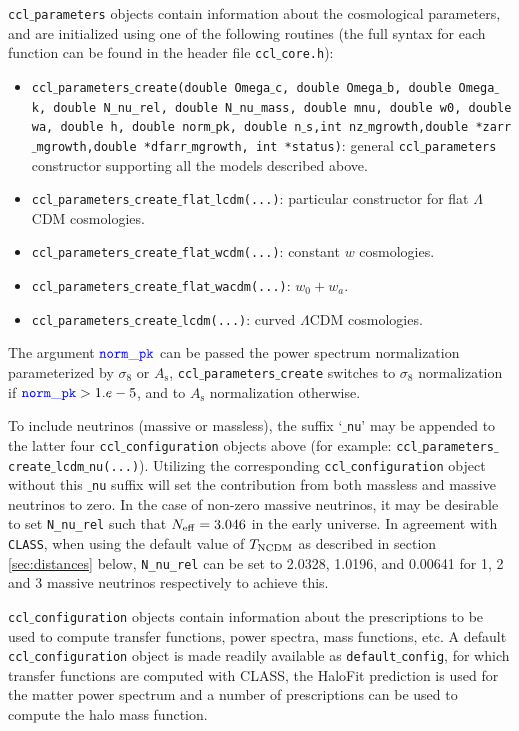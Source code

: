 \documentclass[\docopts]{\docclass}
\begin{document}
{\tt ccl$\_$parameters} objects contain information about the cosmological parameters, and are initialized using one of the following routines (the full syntax for each function can be found in the header file {\tt ccl$\_$core.h}):
\begin{itemize}
 \item {\tt ccl$\_$parameters$\_$create(double Omega$\_$c, double Omega$\_$b, double Omega$\_$k, double N\_nu\_rel, double N\_nu\_mass, double mnu, double w0, double wa, double h, double {\color{blue}norm$\_$pk}, double n$\_$s,int nz$\_$mgrowth,double *zarr$\_$mgrowth,double *dfarr$\_$mgrowth, int *status)}: general {\tt ccl$\_$parameters} constructor supporting all the models described above.
 \item {\tt ccl$\_$parameters$\_$create$\_$flat$\_$lcdm(...)}: particular constructor for flat $\Lambda$CDM cosmologies.
 \item {\tt ccl$\_$parameters$\_$create$\_$flat$\_$wcdm(...)}: constant $w$ cosmologies.
 \item {\tt ccl$\_$parameters$\_$create$\_$flat$\_$wacdm(...)}: $w_0+w_a$.
 \item {\tt ccl$\_$parameters$\_$create$\_$lcdm(...)}: curved $\Lambda$CDM cosmologies.
\end{itemize}
The argument ${\tt {\color{blue}norm\_pk}}$ can be passed the power spectrum normalization parameterized by $\sigma_8$ or $A_\mathrm{s}$, {\tt ccl$\_$parameters$\_$create} switches to $\sigma_8$ normalization if ${\tt {\color{blue}norm\_pk}} > 1.e-5$, and to $A_{\mathrm s}$ normalization otherwise.

To include neutrinos (massive or massless), the suffix `{\tt $\_$nu}' may be appended to the latter four {\tt ccl$\_$configuration} objects above (for example: {\tt ccl$\_$parameters$\_$create$\_$lcdm$\_$nu(...)}). Utilizing the corresponding {\tt ccl$\_$configuration} object without this {\tt $\_$nu} suffix will set the contribution from both massless and massive neutrinos to zero. In the case of non-zero massive neutrinos, it may be desirable to set {\tt N\_nu\_rel} such that $N_{\rm eff}=3.046$ in the early universe. In agreement with {\tt CLASS}, when using the default value of $T_{\rm NCDM}$ as described in section \ref{sec:distances} below, {\tt N\_nu\_rel} can be set to 2.0328, 1.0196, and 0.00641 for 1, 2 and 3 massive neutrinos respectively to achieve this.

{\tt ccl$\_$configuration} objects contain information about the prescriptions to be used to compute transfer functions, power spectra, mass functions, etc. A default {\tt ccl$\_$configuration} object is made readily available as {\tt default$\_$config}, for which transfer functions are computed with CLASS, the HaloFit prediction is used for the matter power spectrum and a number of prescriptions can be used to compute the halo mass function.
\end{document}
